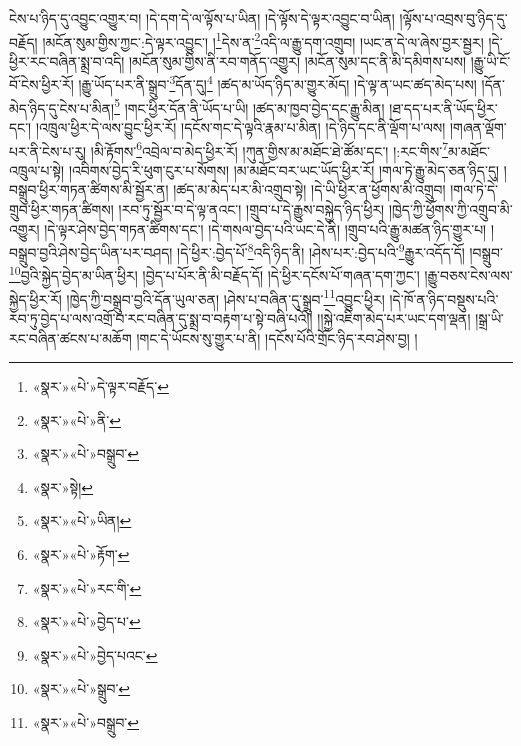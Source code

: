 ངེས་པ་ཉིད་དུ་འབྱུང་འགྱུར་བ། །དེ་དག་དེ་ལ་ལྟོས་པ་ཡིན། །དེ་ལྟོས་དེ་ལྟར་འབྱུང་བ་ཡིན། །ལྟོས་པ་འབྲས་བུ་ཉིད་དུ་བརྗོད། །མངོན་སུམ་གྱིས་ཀྱང་:དེ་ལྟར་འབྱུང་། །\footnote{«སྣར་»«པེ་»དེ་ལྟར་བརྗོད་}དེས་ན་\footnote{«སྣར་»«པེ་»ནི་}འདི་ལ་རྒྱུ་དག་འགྲུབ། །ཡང་ན་དེ་ལ་ཞེས་བྱར་སྦྱར། །དེ་ཕྱིར་རང་བཞིན་སྨྲ་བ་འདི། །མངོན་སུམ་གྱིས་ནི་རབ་གནོད་འགྱུར། །མངོན་སུམ་དང་ནི་མི་དམིགས་པས། །རྒྱུ་ཡི་ངོ་བོ་ངེས་ཕྱིར་རོ། །རྒྱུ་ཡོད་པར་ནི་སྒྲུབ་\footnote{«སྣར་»«པེ་»བསྒྲུབ་}དོན་དུ།\footnote{«སྣར་»སྟེ།} །ཚད་མ་ཡོད་ཉིད་མ་གྱུར་མོད། །དེ་ལྟ་ན་ཡང་ཚད་མེད་པས། །དོན་མེད་ཉིད་དུ་ངེས་པ་མིན།\footnote{«སྣར་»«པེ་»ཡིན།} །གང་ཕྱིར་དོན་ནི་ཡོད་པ་ཡི། །ཚད་མ་ཁྱབ་བྱེད་དང་རྒྱུ་མིན། །ཐ་དད་པར་ནི་ཡོད་ཕྱིར་དང་། །འཁྲུལ་ཕྱིར་དེ་ལས་བྱུང་ཕྱིར་རོ། །དངོས་གང་དེ་ལྟའི་རྣམ་པ་མིན། །དེ་ཉིད་དང་ནི་ལྡོག་པ་ལས། །གཞན་ལྡོག་པར་ནི་ངེས་པ་རུ། །མི་རྟོགས་\footnote{«སྣར་»«པེ་»རྟོག་}འབྲེལ་བ་མེད་ཕྱིར་རོ། །ཀུན་གྱིས་མ་མཐོང་ཐེ་ཚོམ་དང་། །:རང་གིས་\footnote{«སྣར་»«པེ་»རང་གི་}མ་མཐོང་འཁྲུལ་པ་སྟེ། །འབིགས་བྱེད་རི་ཕུག་ངུར་པ་སོགས། །མ་མཐོང་བར་ཡང་ཡོད་ཕྱིར་རོ། །གལ་ཏེ་རྒྱུ་མེད་ཅན་ཉིད་དུ། །བསྒྲུབ་ཕྱིར་གཏན་ཚིགས་མི་སྦྱོར་ན། །ཚད་མ་མེད་པར་མི་འགྲུབ་སྟེ། །དེ་ཡི་ཕྱིར་ན་ཕྱོགས་མི་འགྲུབ། །གལ་ཏེ་དེ་གྲུབ་ཕྱིར་གཏན་ཚིགས། །རབ་ཏུ་སྦྱོར་བ་དེ་ལྟ་ནའང་། །གྲུབ་པ་དེ་རྒྱུས་བསྐྱེད་ཉིད་ཕྱིར། །ཁྱེད་ཀྱི་ཕྱོགས་ཀྱི་འགྲུབ་མི་འགྱུར། །དེ་ལྟར་ཤེས་བྱེད་གཏན་ཚིགས་དང་། །དེ་གསལ་བྱེད་པའི་ཡང་དེ་ནི། །གྲུབ་པའི་རྒྱུ་མཚན་ཉིད་གྱུར་པ། །བསྒྲུབ་བྱའི་ཤེས་བྱེད་ཡིན་པར་བཤད། །དེ་ཕྱིར་:བྱེད་པོ་\footnote{«སྣར་»«པེ་»བྱེད་པ་}འདི་ཉིད་ནི། །ཤེས་པར་:བྱེད་པའི་\footnote{«སྣར་»«པེ་»བྱེད་པའང་}རྒྱུར་འདོད་དོ། །བསྒྲུབ་\footnote{«སྣར་»«པེ་»སྒྲུབ་}བྱའི་སྐྱེད་བྱེད་མ་ཡིན་ཕྱིར། །བྱེད་པ་པོར་ནི་མི་བརྗོད་དོ། །དེ་ཕྱིར་དངོས་པོ་གཞན་དག་ཀྱང་། །རྒྱུ་བཅས་ངེས་ལས་སྐྱེད་ཕྱིར་རོ། །ཁྱེད་ཀྱི་བསྒྲུབ་བྱའི་དོན་ཡུལ་ཅན། །ཤེས་པ་བཞིན་དུ་སྒྲུབ་\footnote{«སྣར་»«པེ་»བསྒྲུབ་}འབྱུང་ཕྱིར། །དེ་ཁོ་ན་ཉིད་བསྡུས་པའི་རབ་ཏུ་བྱེད་པ་ལས་འགྲོ་བ་རང་བཞིན་དུ་སྨྲ་བ་བརྟག་པ་སྟེ་བཞི་པའོ།། །།སྐྱེ་འཇིག་མེད་པར་ཡང་དག་ལྡན། །སྒྲ་ཡི་རང་བཞིན་ཚངས་པ་མཆོག །གང་དེ་ཡོངས་སུ་གྱུར་པ་ནི། །དངོས་པོའི་གྲོང་ཉིད་རབ་ཤེས་བྱ། །
